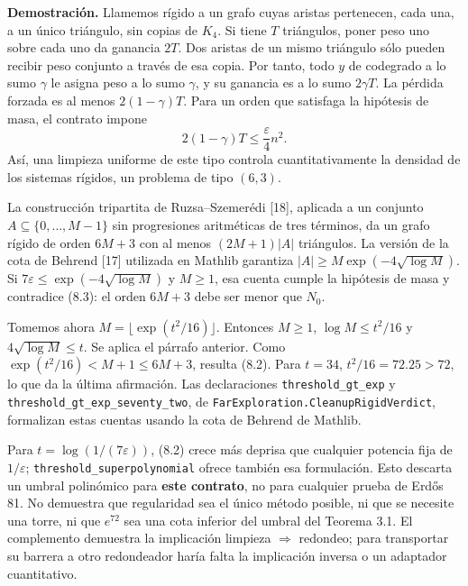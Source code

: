 \documentclass[spanish,11pt,a4paper]{article}
\begin{document}
\textbf{Demostración.} Llamemos rígido a un grafo cuyas aristas pertenecen, cada una, a un único triángulo, sin copias de \(K_4\). Si tiene \(T\) triángulos, poner peso uno sobre cada uno da ganancia \(2T\). Dos aristas de un mismo triángulo sólo pueden recibir peso conjunto a través de esa copia. Por tanto, todo \(y\) de codegrado a lo sumo \(\gamma\) le asigna peso a lo sumo \(\gamma\), y su ganancia es a lo sumo \(2\gamma T\). La pérdida forzada es al menos \(2(1-\gamma)T\). Para un orden que satisfaga la hipótesis de masa, el contrato impone \[
2(1-\gamma)T\le\frac{\varepsilon}{4}n^2.
\tag{8.3}
\] Así, una limpieza uniforme de este tipo controla cuantitativamente la densidad de los sistemas rígidos, un problema de tipo \((6,3)\).

La construcción tripartita de Ruzsa--Szemerédi {[}18{]}, aplicada a un conjunto \(A\subseteq\{0,\ldots,M-1\}\) sin progresiones aritméticas de tres términos, da un grafo rígido de orden \(6M+3\) con al menos \((2M+1)|A|\) triángulos. La versión de la cota de Behrend {[}17{]} utilizada en Mathlib garantiza \(|A|\ge M\exp(-4\sqrt{\log M})\). Si \(7\varepsilon\le\exp(-4\sqrt{\log M})\) y \(M\ge1\), esa cuenta cumple la hipótesis de masa y contradice (8.3): el orden \(6M+3\) debe ser menor que \(N_0\).

Tomemos ahora \(M=\lfloor\exp(t^2/16)\rfloor\). Entonces \(M\ge1\), \(\log M\le t^2/16\) y \(4\sqrt{\log M}\le t\). Se aplica el párrafo anterior. Como \(\exp(t^2/16)<M+1\le6M+3\), resulta (8.2). Para \(t=34\), \(t^2/16=72.25>72\), lo que da la última afirmación. Las declaraciones \nolinkurl{threshold_gt_exp} y \nolinkurl{threshold_gt_exp_seventy_two}, de \nolinkurl{FarExploration.CleanupRigidVerdict}, formalizan estas cuentas usando la cota de Behrend de Mathlib.

Para \(t=\log(1/(7\varepsilon))\), (8.2) crece más deprisa que cualquier potencia fija de \(1/\varepsilon\); \nolinkurl{threshold_superpolynomial} ofrece también esa formulación. Esto descarta un umbral polinómico para \textbf{este contrato}, no para cualquier prueba de Erdős 81. No demuestra que regularidad sea el único método posible, ni que se necesite una torre, ni que \(e^{72}\) sea una cota inferior del umbral del Teorema 3.1. El complemento demuestra la implicación limpieza \(\Rightarrow\) redondeo; para transportar su barrera a otro redondeador haría falta la implicación inversa o un adaptador cuantitativo.
\end{document}
